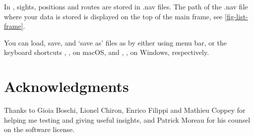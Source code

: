 \documentclass{ol-softwaremanual}
\makeatletter
\def\setmenukeyswin{\def\tw@mk@os{win}}
\def\setmenukeysmac{\def\tw@mk@os{mac}}
\makeatother
\begin{document}
In \thel, \glspl{sight}, \glspl{position} and \glspl{route} are stored in .nav files. The path of the .nav file where your data is stored is displayed on the top of the main frame, see \cref{fig-list-frame}. 








You can load, save, and `save as' files as by either using \thel menu bar, or the keyboard shortcuts 
\setmenukeysmac
{}, ,  on macOS, and  
\setmenukeyswin
{}, ,  on Windows, respectively.  


\pagebreak

\section*{Acknowledgments}

Thanks to Gioia Boschi, Lionel Chiron, Enrico Filippi and Mathieu Coppey for helping me testing \thel and giving useful insights, and Patrick Moreau for his counsel on the software license. 

\printacronyms[pages={display=all,seq/use=false}]

\printnoidxglossary



\end{document}
